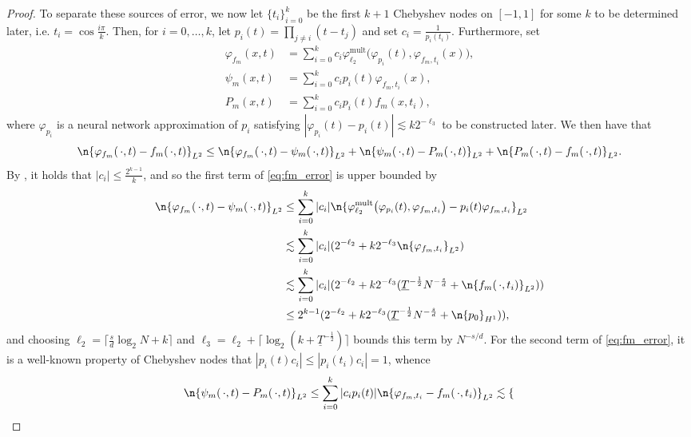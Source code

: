 \documentclass[a4paper, 11pt, headings = small, abstract]{scrartcl}
\begin{document}
\begin{proof}
	To separate these sources of error, we now let $\{t_i\}_{i=0}^k$ be the first $k+1$ Chebyshev nodes on $[-1, 1]$ for some $k$ to be determined later, i.e. $t_i=\cos\frac{i\pi}{k}$.
	Then, for $i=0,\ldots,k$, let $p_i(t)=\prod_{j\neq i}(t-t_j)$ and set $c_i=\frac{1}{p_i(t_i)}$.
	Furthermore, set
	\begin{align*}
		\varphi_{f_m}(x, t)
		&=\sum_{i=0}^{k}c_i\varphi_{\ell_2}^{\mathrm{mult}}\big(\varphi_{p_i}(t), \varphi_{f_m, t_i}(x)\big), \\
		\psi_{m}(x, t)
		&=\sum_{i=0}^{k}c_ip_i(t)\varphi_{f_m, t_i}(x), \\
		P_m(x, t)
		&=\sum_{i=0}^{k}c_ip_i(t)f_m(x, t_i),
	\end{align*}
	where $\varphi_{p_i}$ is a neural network approximation of $p_i$ satisfying $|\varphi_{p_i}(t)-p_i(t)|\lesssim k2^{-\ell_3}$ to be constructed later.
	We then have that
	\begin{equation}
		\label{eq:fm_error}
		\n{\varphi_{f_m}(\,\cdot,t)-f_m(\,\cdot,t)}_{L^2}
		\le\n{\varphi_{f_m}(\,\cdot,t)-\psi_m(\,\cdot,t)}_{L^2}
		+\n{\psi_m(\,\cdot,t)-P_m(\,\cdot,t)}_{L^2}
		+\n{P_m(\,\cdot,t)-f_m(\,\cdot,t)}_{L^2}.
	\end{equation}
	By \cite[Theorem 5.2]{trefethen13}, it holds that $|c_i|\le \frac{2^{k-1}}{k}$, and so the first term of \eqref{eq:fm_error} is upper bounded by
	\begin{align*}
		\n{\varphi_{f_m}(\,\cdot,t)-\psi_m(\,\cdot,t)}_{L^2}
		&\le\sum_{i=0}^{k}|c_i|\n{\varphi_{\ell_2}^{\mathrm{mult}}\big(\varphi_{p_i}(t), \varphi_{f_m, t_i}\big)-p_i(t)\varphi_{f_m, t_i}}_{L^2} \\
		&\lesssim\sum_{i=0}^{k}|c_i|(2^{-\ell_2}+k2^{-\ell_3}\n{\varphi_{f_m, t_i}}_{L^2}) \\
		&\lesssim\sum_{i=0}^{k{}}|c_i|(2^{-\ell_2}+k2^{-\ell_3}(\underline{T}^{-\frac{1}{2}}N^{-\frac{s}{d}}+\n{f_m(\,\cdot,t_i)}_{L^2})) \\
		&\le 2^{k-1}(2^{-\ell_2}+k2^{-\ell_3}(\underline{T}^{-\frac{1}{2}}N^{-\frac{s}{d}}+\n{p_0}_{H^1})),
	\end{align*}
	and choosing $\ell_2=\lceil\frac{s}{d}\log_2 N+k\rceil$ and $\ell_3=\ell_2+\lceil\log_2 (k+\underline{T}^{-\frac{1}{2}     })\rceil$ bounds this term by $N^{-s/d}$.
	For the second term of \eqref{eq:fm_error}, it is a well-known property of Chebyshev nodes that $|p_i(t)c_i|\le|p_i(t_i)c_i|=1$, whence
	\[
		\n{\psi_m(\,\cdot,t)-P_m(\,\cdot,t)}_{L^2}
		\le\sum_{i=0}^{k}|c_ip_i(t)|\n{\varphi_{f_m, t_i}-f_m(\,\cdot,t_i)}_{L^2}
		\lesssim \begin{cases}

\end{cases}\]
\end{proof}
\end{document}

